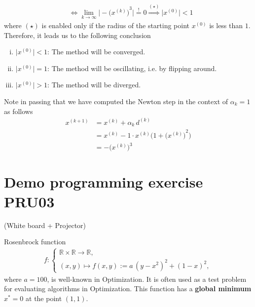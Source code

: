 \documentclass[12pt]{article}
\begin{document}
\begin{enumerate}[(i)]
\begin{align}
		       & \Leftrightarrow \lim_{k \to \infty} \Big| - { \Big( x^{(k)} \Big)}^3 \Big| \stackrel{!}{=} 0
		      \stackrel{(\star)}{\Rightarrow}
		      \big| x^{(0)} \big|  < 1
	      \end{align}
	      where $(\star)$ is enabled only if the radius of the starting point $x^{(0)}$ is less than $1$.
	      Therefore, it leads us to the following conclusion
	      \begin{enumerate}[(i)]
		      \item \( \big| x^{(0)} \big| < 1 \): The method will be converged.
		      \item \( \big| x^{(0)} \big| = 1 \): The method will be oscillating, i.e. by flipping around.
		      \item \( \big| x^{(0)} \big| > 1 \): The method will be diverged.
	      \end{enumerate}
	      
	      Note in passing that we have computed the Newton step 
	      in the context of $\alpha_k = 1$ as follows
	      \begin{align}
		      x^{(k+1)}
		       & = x^{(k)} + \alpha_k \, d^{(k)}                                    \\
		       & = x^{(k)} - 1 \cdot x^{(k)} \Bigg(1 + {\Big(x^{(k)}\Big)}^2 \Bigg) \\
		       & = - \Big( x^{(k)} \Big)^3
	      \end{align}
\end{enumerate}


\clearpage
\section{Demo programming exercise PRU03}
 (White board + Projector)
\begin{remarkboxed}
	Rosenbrock function
	\begin{align}
		f:
		\begin{cases}
			\mathbb{R} \times \mathbb{R} \to \mathbb{R}, \\
			(x,y) \mapsto f(x,y) := a\, (y-x^2)^2 + (1-x)^2,
		\end{cases}
	\end{align}
	where $a=100$,
	is well-known in Optimization. It is often used as a test problem 
	for evaluating algorithms in Optimization.
	This function has a \textbf{global minimum} $x^* = 0$ at the point $(1,1)$.
\end{remarkboxed}



% 
\end{document}
